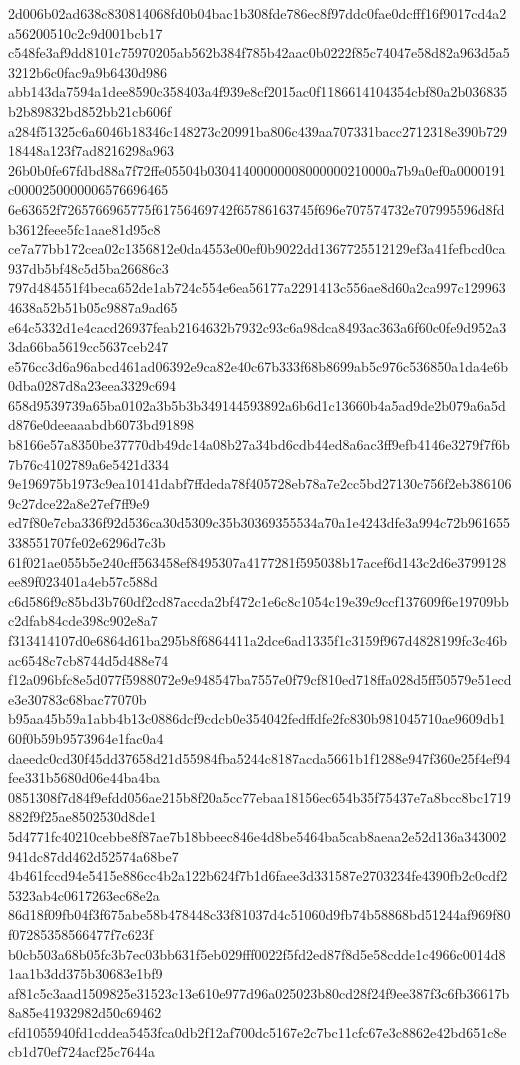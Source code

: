 {2d006b02ad638c830814068fd0b04bac1b308fde786ec8f97ddc0fae0dcfff16f9017cd4a2a56200510c2c9d001bcb17
c548fe3af9dd8101c75970205ab562b384f785b42aac0b0222f85c74047e58d82a963d5a53212b6c0fac9a9b6430d986
abb143da7594a1dee8590c358403a4f939e8cf2015ac0f1186614104354cbf80a2b036835b2b89832bd852bb21cb606f
a284f51325c6a6046b18346c148273c20991ba806c439aa707331bacc2712318e390b72918448a123f7ad8216298a963
26b0b0fe67fdbd88a7f72ffe05504b03041400000008000000210000a7b9a0ef0a0000191c0000250000006576696465
6e63652f7265766965775f61756469742f65786163745f696e707574732e707995596d8fdb3612feee5fc1aae81d95c8
ce7a77bb172cea02c1356812e0da4553e00ef0b9022dd1367725512129ef3a41fefbcd0ca937db5bf48c5d5ba26686c3
797d484551f4beca652de1ab724c554e6ea56177a2291413c556ae8d60a2ca997c1299634638a52b51b05c9887a9ad65
e64c5332d1e4cacd26937feab2164632b7932c93c6a98dca8493ac363a6f60c0fe9d952a33da66ba5619cc5637ceb247
e576cc3d6a96abcd461ad06392e9ca82e40c67b333f68b8699ab5c976c536850a1da4e6b0dba0287d8a23eea3329c694
658d9539739a65ba0102a3b5b3b349144593892a6b6d1c13660b4a5ad9de2b079a6a5dd876e0deeaaabdb6073bd91898
b8166e57a8350be37770db49dc14a08b27a34bd6cdb44ed8a6ac3ff9efb4146e3279f7f6b7b76c4102789a6e5421d334
9e196975b1973c9ea10141dabf7ffdeda78f405728eb78a7e2cc5bd27130c756f2eb3861069c27dce22a8e27ef7ff9e9
ed7f80e7cba336f92d536ca30d5309c35b30369355534a70a1e4243dfe3a994c72b961655338551707fe02e6296d7c3b
61f021ae055b5e240cff563458ef8495307a4177281f595038b17acef6d143c2d6e3799128ee89f023401a4eb57c588d
c6d586f9c85bd3b760df2cd87accda2bf472c1e6c8c1054c19e39c9ccf137609f6e19709bbc2dfab84cde398c902e8a7
f313414107d0e6864d61ba295b8f6864411a2dce6ad1335f1c3159f967d4828199fc3c46bac6548c7cb8744d5d488e74
f12a096bfc8e5d077f5988072e9e948547ba7557e0f79cf810ed718ffa028d5ff50579e51ecde3e30783c68bac77070b
b95aa45b59a1abb4b13c0886dcf9cdcb0e354042fedffdfe2fc830b981045710ae9609db160f0b59b9573964e1fac0a4
daeedc0cd30f45dd37658d21d55984fba5244c8187acda5661b1f1288e947f360e25f4ef94fee331b5680d06e44ba4ba
0851308f7d84f9efdd056ae215b8f20a5cc77ebaa18156ec654b35f75437e7a8bcc8bc1719882f9f25ae8502530d8de1
5d4771fc40210cebbe8f87ae7b18bbeec846e4d8be5464ba5cab8aeaa2e52d136a343002941dc87dd462d52574a68be7
4b461fccd94e5415e886cc4b2a122b624f7b1d6faee3d331587e2703234fe4390fb2c0cdf25323ab4c0617263ec68e2a
86d18f09fb04f3f675abe58b478448c33f81037d4c51060d9fb74b58868bd51244af969f80f07285358566477f7c623f
b0cb503a68b05fc3b7ec03bb631f5eb029fff0022f5fd2ed87f8d5e58cdde1c4966c0014d81aa1b3dd375b30683e1bf9
af81c5c3aad1509825e31523c13e610e977d96a025023b80cd28f24f9ee387f3c6fb36617b8a85e41932982d50c69462
cfd1055940fd1cddea5453fca0db2f12af700dc5167e2c7bc11cfc67e3c8862e42bd651c8ecb1d70ef724acf25c7644a
}
